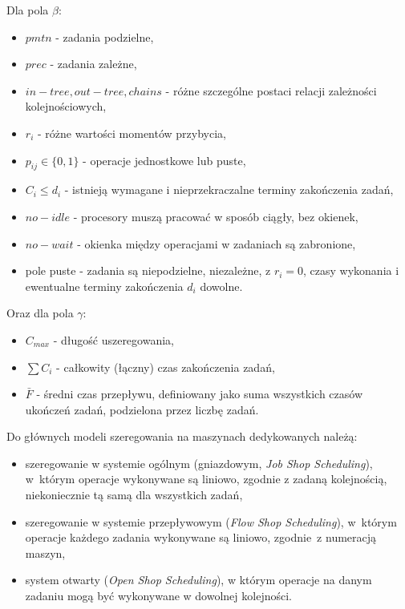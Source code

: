 \documentclass[brudnopis]{xmgr}
\begin{document}
Dla pola $\beta$:
\begin{itemize}
    \item $pmtn$ - zadania podzielne,
    \item $prec$ - zadania zależne,
    \item $in-tree, out-tree, chains$ - różne szczególne postaci relacji zależności kolejnościowych,
    \item $r_i$ - różne wartości momentów przybycia,
    \item $p_{ij}\in\{0,1\}$ - operacje jednostkowe lub puste,
    \item $C_i\leq d_i$ - istnieją wymagane i nieprzekraczalne terminy zakończenia zadań,
    \item $no-idle$ - procesory muszą pracować w sposób ciągły, bez okienek,
    \item $no-wait$ - okienka między operacjami w zadaniach są zabronione,
    \item pole puste - zadania są niepodzielne, niezależne, z $r_i=0$, czasy wykonania i ewentualne terminy zakończenia $d_i$ dowolne.
\end{itemize}

Oraz dla pola $\gamma$:
\begin{itemize}
    \item $C_{max}$ - długość uszeregowania,
    \item $\sum{C_i}$ - całkowity (łączny) czas zakończenia zadań,
    \item $\bar{F}$ - średni czas przepływu, definiowany jako suma wszystkich czasów ukończeń zadań, podzielona przez liczbę zadań.
\end{itemize}


Do głównych modeli szeregowania na maszynach dedykowanych należą:
\begin{itemize}
    \item szeregowanie w systemie ogólnym (gniazdowym, \emph{Job Shop Scheduling}), w~którym operacje wykonywane są liniowo, zgodnie z zadaną kolejnością, niekoniecznie tą samą dla wszystkich zadań,
    \item szeregowanie w systemie przepływowym (\emph{Flow Shop Scheduling}), w~którym operacje każdego zadania wykonywane są liniowo, zgodnie~z numeracją maszyn,
    \item system otwarty (\emph{Open Shop Scheduling}), w którym operacje na danym zadaniu mogą być wykonywane w dowolnej kolejności.
\end{itemize}
\end{document}
